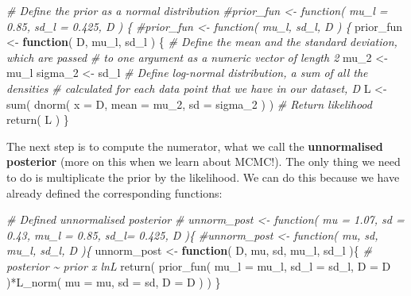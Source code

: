 \documentclass[
]{article}
\newenvironment{Shaded}{\begin{snugshade}}{\end{snugshade}}
\newcommand{\AttributeTok}[1]{\textcolor[rgb]{0.77,0.63,0.00}{#1}}
\newcommand{\CommentTok}[1]{\textcolor[rgb]{0.56,0.35,0.01}{\textit{#1}}}
\newcommand{\ControlFlowTok}[1]{\textcolor[rgb]{0.13,0.29,0.53}{\textbf{#1}}}
\newcommand{\FunctionTok}[1]{\textcolor[rgb]{0.00,0.00,0.00}{#1}}
\newcommand{\NormalTok}[1]{#1}
\newcommand{\OtherTok}[1]{\textcolor[rgb]{0.56,0.35,0.01}{#1}}
\newcommand{\SpecialCharTok}[1]{\textcolor[rgb]{0.00,0.00,0.00}{#1}}
\begin{document}
\begin{Shaded}
\begin{Highlighting}[]
\CommentTok{\# Define the prior as a normal distribution }
\CommentTok{\#prior\_fun \textless{}{-} function( mu\_l = 0.85, sd\_l = 0.425, D ) \{}
\CommentTok{\#prior\_fun \textless{}{-} function( mu\_l, sd\_l, D ) \{}
\NormalTok{prior\_fun }\OtherTok{\textless{}{-}} \ControlFlowTok{function}\NormalTok{( D, mu\_l, sd\_l ) \{}
  \CommentTok{\# Define the mean and the standard deviation, which are passed }
  \CommentTok{\# to one argument as a numeric vector of length 2}
\NormalTok{  mu\_2    }\OtherTok{\textless{}{-}}\NormalTok{ mu\_l}
\NormalTok{  sigma\_2 }\OtherTok{\textless{}{-}}\NormalTok{ sd\_l}
  \CommentTok{\# Define log{-}normal distribution, a sum of all the densities }
  \CommentTok{\# calculated for each data point that we have in our dataset, D}
\NormalTok{  L   }\OtherTok{\textless{}{-}} \FunctionTok{sum}\NormalTok{( }\FunctionTok{dnorm}\NormalTok{( }\AttributeTok{x =}\NormalTok{ D, }\AttributeTok{mean =}\NormalTok{ mu\_2, }\AttributeTok{sd =}\NormalTok{ sigma\_2 ) )}
  \CommentTok{\# Return likelihood }
  \FunctionTok{return}\NormalTok{( L )}
\NormalTok{\}}
\end{Highlighting}
\end{Shaded}

The next step is to compute the numerator, what we call the
\textbf{unnormalised posterior} (more on this when we learn about
MCMC!). The only thing we need to do is multiplicate the prior by the
likelihood. We can do this because we have already defined the
corresponding functions:

\begin{Shaded}
\begin{Highlighting}[]
\CommentTok{\# Defined unnormalised posterior}
\CommentTok{\# unnorm\_post \textless{}{-} function( mu = 1.07, sd = 0.43, mu\_l = 0.85, sd\_l= 0.425, D )\{}
\CommentTok{\#unnorm\_post \textless{}{-} function( mu, sd, mu\_l, sd\_l, D )\{}
\NormalTok{unnorm\_post }\OtherTok{\textless{}{-}} \ControlFlowTok{function}\NormalTok{( D, mu, sd, mu\_l, sd\_l )\{}
  \CommentTok{\# posterior \textasciitilde{} prior x lnL}
  \FunctionTok{return}\NormalTok{( }\FunctionTok{prior\_fun}\NormalTok{( }\AttributeTok{mu\_l =}\NormalTok{ mu\_l, }\AttributeTok{sd\_l =}\NormalTok{ sd\_l, }\AttributeTok{D =}\NormalTok{ D )}\SpecialCharTok{*}\FunctionTok{L\_norm}\NormalTok{( }\AttributeTok{mu =}\NormalTok{ mu, }\AttributeTok{sd =}\NormalTok{ sd, }\AttributeTok{D =}\NormalTok{ D ) )}
\NormalTok{\}}
\end{Highlighting}
\end{Shaded}
\end{document}
